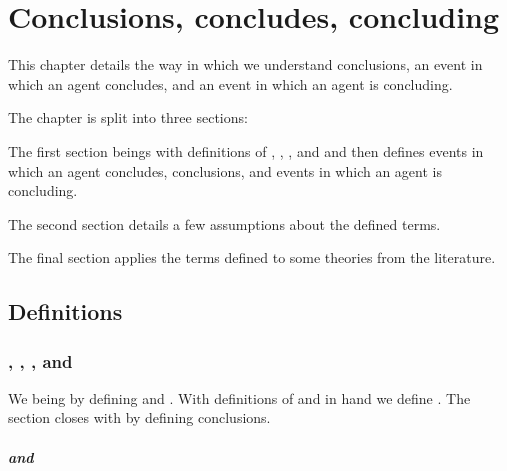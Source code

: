 \chapter{Conclusions, concludes, concluding}
\label{cha:clar}

\begin{note}
  This chapter details the way in which we understand conclusions, an event in which an agent concludes, and an event in which an agent is concluding.
\end{note}


\begin{note}
  The chapter is split into three sections:

  The first section beings with definitions of , , , and  and then defines events in which an agent concludes, conclusions, and events in which an agent is concluding.

  The second section details a few assumptions about the defined terms.

  The final section applies the terms defined to some theories from the literature.
\end{note}



\section{Definitions}
\label{cha:clar:sec:Cons}


\subsection{, , , and }
\label{cha:clar:sec:Cons:pvp}

\begin{note}
  We being by defining  and .
  With definitions of  and  in hand we define .
  The section closes with by defining conclusions.
\end{note}

\paragraph*{ and }

